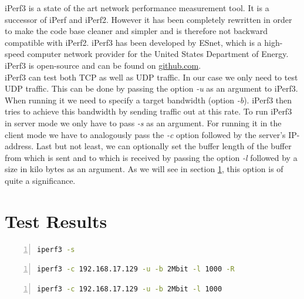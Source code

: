 iPerf3 is a state of the art network performance measurement tool. It is a successor of iPerf and iPerf2. However it has been completely rewritten in order to make the code base cleaner and simpler and is therefore not backward compatible with iPerf2. iPerf3 has been developed by \ac{ESnet}, which is a high-speed computer network provider for the United States Department of Energy. iPerf3 is open-source and can be found on \href{https://github.com/esnet/iperf}{github.com}.
\\
iPerf3 can test both \ac{TCP} as well as \acs{UDP} traffic. In our case we only need to test \acs{UDP} traffic. This can be done by passing the option \textit{-u} as an argument to iPerf3. When running it we need to specify a target bandwidth (option \textit{-b}). iPerf3 then tries to achieve this bandwidth by sending traffic out at this rate. To run iPerf3 in server mode we only have to pass \textit{-s} as an argument. For running it in the client mode we have to analogously pass the \textit{-c} option followed by the server's \acs{IP}-address. Last but not least, we can optionally set the buffer length of the buffer from which is sent and to which is received by passing the option \textit{-l} followed by a size in kilo bytes as an argument. As we will see in section \ref{Test Results}, this option is of quite a significance.

\section{Test Results}\label{Test Results}

\begin{lstlisting}[language=sh, caption = Test Server Command, captionpos=b, numbers=left, frame=single, breaklines=true, breakatwhitespace=true, showstringspaces=false, label=Test Server Command]
iperf3 -s
\end{lstlisting}

\begin{lstlisting}[language=sh, caption = Ingress Test Command, captionpos=b, numbers=left, frame=single, breaklines=true, breakatwhitespace=true, showstringspaces=false, label=Ingress Test Command]
iperf3 -c 192.168.17.129 -u -b 2Mbit -l 1000 -R
\end{lstlisting}

\begin{lstlisting}[language=sh, caption = Egress Test Command, captionpos=b, numbers=left, frame=single, breaklines=true, breakatwhitespace=true, showstringspaces=false, label=Egress Test Command]
iperf3 -c 192.168.17.129 -u -b 2Mbit -l 1000
\end{lstlisting}




